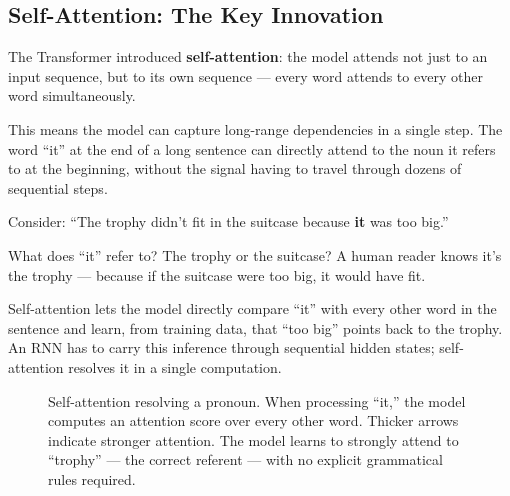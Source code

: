 \subsection{Self-Attention: The Key Innovation}

The Transformer introduced \textbf{self-attention}: the model attends not just to an input sequence, but to its own sequence --- every word attends to every other word simultaneously.

This means the model can capture long-range dependencies in a single step.
The word ``it'' at the end of a long sentence can directly attend to the noun it refers to at the beginning, without the signal having to travel through dozens of sequential steps.

\begin{tcolorbox}[colback=green!5!white, colframe=green!40!black, title=Why Self-Attention Matters]
Consider: ``The trophy didn't fit in the suitcase because \textbf{it} was too big.''

What does ``it'' refer to? The trophy or the suitcase?
A human reader knows it's the trophy --- because if the suitcase were too big, it would have fit.

Self-attention lets the model directly compare ``it'' with every other word in the sentence and learn, from training data, that ``too big'' points back to the trophy.
An RNN has to carry this inference through sequential hidden states; self-attention resolves it in a single computation.
\end{tcolorbox}

\begin{figure}[htb]
\centering
{}
\caption{Self-attention resolving a pronoun. When processing ``it,'' the model computes an attention score over every other word. Thicker arrows indicate stronger attention. The model learns to strongly attend to ``trophy'' --- the correct referent --- with no explicit grammatical rules required.}
\end{figure}

